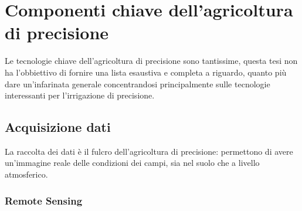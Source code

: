 \documentclass[12pt,a4paper,openright,twoside]{book}
\begin{document}
\section{Componenti chiave dell’agricoltura di precisione}
\label{componenti-chiave}



Le tecnologie chiave dell'agricoltura di precisione sono tantissime, questa tesi non ha l'obbiettivo di fornire una lista esaustiva e completa a riguardo, quanto più dare un'infarinata generale concentrandosi principalmente sulle tecnologie interessanti per l'irrigazione di precisione.
\subsection{Acquisizione dati}
La raccolta dei dati è il fulcro dell'agricoltura di precisione: permettono di avere un'immagine reale delle condizioni dei campi, sia nel suolo che a livello atmosferico.

\subsubsection{Remote Sensing}
\end{document}
